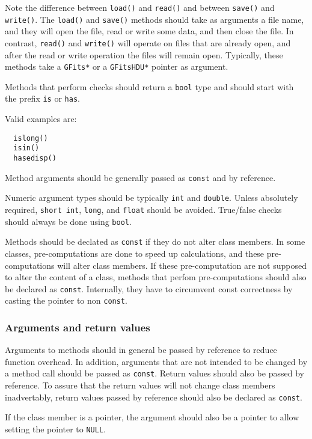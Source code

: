 \documentclass{article}[12pt,a4]
\begin{document}
Note the difference between {\tt load()} and {\tt read()} and between {\tt save()} and {\tt write()}.
The {\tt load()} and {\tt save()} methods should take as arguments a file name, and they
will open the file, read or write some data, and then close the file.
In contrast, {\tt read()} and {\tt write()} will operate on files that are already open, and after
the read or write operation the files will remain open.
Typically, these methods take a {\tt GFits*} or a {\tt GFitsHDU*} pointer as argument.

Methods that perform checks should return a {\tt bool} type and should start with the
prefix {\tt is} or {\tt has}.

Valid examples are:
\begin{verbatim}
  islong()
  isin()
  hasedisp()
\end{verbatim}

Method arguments should be generally passed as {\tt const} and by reference.

Numeric argument types should be typically {\tt int} and {\tt double}.
Unless absolutely required, {\tt short int}, {\tt long}, and {\tt float} should be avoided.
True/false checks should always be done using {\tt bool}.

Methods should be declated as {\tt const} if they do not alter class members.
In some classes, pre-computations are done to speed up calculations, and these
pre-computations will alter class members.
If these pre-computation are not supposed to alter the content of a class,
methods that perfom pre-computations should also be declared as {\tt const}.
Internally, they have to circumvent const correctness by casting the pointer to
non {\tt const}.


\subsubsection{Arguments and return values}

Arguments to methods should in general be passed by reference to reduce function
overhead.
In addition, arguments that are not intended to be changed by a method call should
be passed as {\tt const}.
Return values should also be passed by reference.
To assure that the return values will not change class members inadvertably, return
values passed by reference should also be declared as {\tt const}.


If the class member is a pointer, the argument should also be a pointer to allow
setting the pointer to {\tt NULL}.
\end{document}
